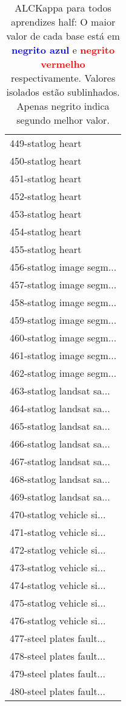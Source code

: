 \begin{table}[h]
\caption{ALCKappa para todos aprendizes half: O maior valor de cada base está em \textcolor{blue}{\textbf{negrito azul}} e \textcolor{red}{\textbf{negrito vermelho}} respectivamente. Valores isolados estão sublinhados. Apenas negrito indica segundo melhor valor.}
\begin{center}\begin{tabular}{l}
 & \\ \hline 449-statlog heart &  \\
450-statlog heart &  \\
451-statlog heart &  \\
452-statlog heart &  \\
453-statlog heart &  \\
454-statlog heart &  \\
455-statlog heart &  \\ \hline
456-statlog image segm... &  \\
457-statlog image segm... &  \\
458-statlog image segm... &  \\
459-statlog image segm... &  \\
460-statlog image segm... &  \\
461-statlog image segm... &  \\
462-statlog image segm... &  \\ \hline
463-statlog landsat sa... &  \\
464-statlog landsat sa... &  \\
465-statlog landsat sa... &  \\
466-statlog landsat sa... &  \\
467-statlog landsat sa... &  \\
468-statlog landsat sa... &  \\
469-statlog landsat sa... &  \\ \hline
470-statlog vehicle si... &  \\
471-statlog vehicle si... &  \\
472-statlog vehicle si... &  \\
473-statlog vehicle si... &  \\
474-statlog vehicle si... &  \\
475-statlog vehicle si... &  \\
476-statlog vehicle si... &  \\ \hline
477-steel plates fault... &  \\
478-steel plates fault... &  \\
479-steel plates fault... &  \\
480-steel plates fault... &  \\\end{tabular}\label{stratsALCKappa14AllReduxb}
\end{center}
\end{table}
